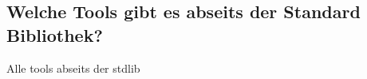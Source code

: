 \subsection{Welche Tools gibt es abseits der Standard Bibliothek?}\label{python-tools:extlib}
Alle tools abseits der stdlib




